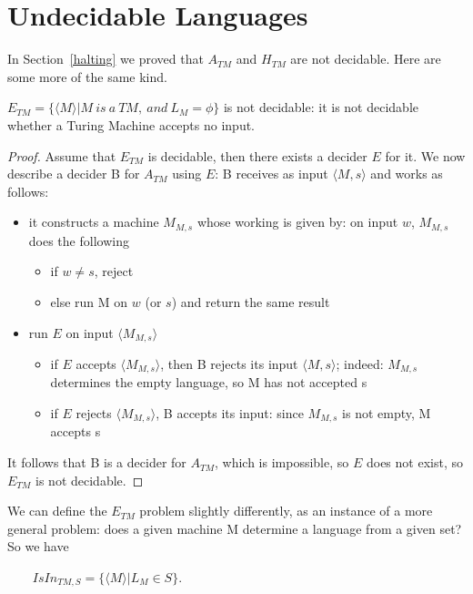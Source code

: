 \section{Undecidable Languages}

In Section~\ref{halting} we proved that $A_{TM}$ and $H_{TM}$ are not
decidable. Here are some more of the same kind.

\begin{theorem} \label{nonreductie1}
$E_{TM} = \{\langle M \rangle | M~is~a~TM,~and~L_M = \phi\}$ is not
     decidable: it is not decidable whether a Turing Machine accepts
     no input.
\end{theorem}
\begin{proof}
Assume that $E_{TM}$ is decidable, then there exists a decider $E$ for
it. We now describe a decider B for $A_{TM}$ using $E$:
B receives as input $\langle M,s \rangle$ and works as follows:
\begin{itemize}
\item
it constructs a machine $M_{M,s}$ whose working is given by: on input
$w$, $M_{M,s}$ does the following
\begin{itemize}
\item if $w \neq s$, reject
\item else run M on $w$ (or $s$) and return the same result
\end{itemize}

\item
run $E$ on input $\langle M_{M,s} \rangle$
\begin{itemize}
\item if $E$ accepts $\langle M_{M,s} \rangle$, then B rejects its
  input $\langle M,s \rangle$; indeed: $M_{M,s}$ determines the empty
  language, so M has not accepted s
\item if $E$ rejects $\langle M_{M,s} \rangle$, B accepts its input: since  $M_{M,s}$ is not empty, M accepts s
\end{itemize}

\end{itemize}
It follows that B is a decider for $A_{TM}$, which is impossible, so
$E$ does not exist, so $E_{TM}$ is not decidable.
\end{proof}

We can define the $E_{TM}$ problem slightly differently, as an instance
of a more general problem: does a given machine M determine a language
from a given set? So we have

$~~~~~~~~~IsIn_{TM,S} = \{\langle M \rangle| L_M \in S\}$.


